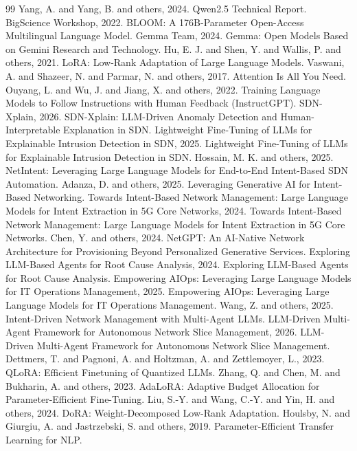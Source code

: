 \documentclass[12pt,a4paper]{article}
\begin{document}
\begin{thebibliography}{99}
 Yang, A. and Yang, B. and others, 2024. Qwen2.5 Technical Report.
 BigScience Workshop, 2022. BLOOM: A 176B-Parameter Open-Access Multilingual Language Model.
 Gemma Team, 2024. Gemma: Open Models Based on Gemini Research and Technology.
 Hu, E. J. and Shen, Y. and Wallis, P. and others, 2021. LoRA: Low-Rank Adaptation of Large Language Models.
 Vaswani, A. and Shazeer, N. and Parmar, N. and others, 2017. Attention Is All You Need.
 Ouyang, L. and Wu, J. and Jiang, X. and others, 2022. Training Language Models to Follow Instructions with Human Feedback (InstructGPT).
 SDN-Xplain, 2026. SDN-Xplain: LLM-Driven Anomaly Detection and Human-Interpretable Explanation in SDN.
 Lightweight Fine-Tuning of LLMs for Explainable Intrusion Detection in SDN, 2025. Lightweight Fine-Tuning of LLMs for Explainable Intrusion Detection in SDN.
 Hossain, M. K. and others, 2025. NetIntent: Leveraging Large Language Models for End-to-End Intent-Based SDN Automation.
 Adanza, D. and others, 2025. Leveraging Generative AI for Intent-Based Networking.
 Towards Intent-Based Network Management: Large Language Models for Intent Extraction in 5G Core Networks, 2024. Towards Intent-Based Network Management: Large Language Models for Intent Extraction in 5G Core Networks.
 Chen, Y. and others, 2024. NetGPT: An AI-Native Network Architecture for Provisioning Beyond Personalized Generative Services.
 Exploring LLM-Based Agents for Root Cause Analysis, 2024. Exploring LLM-Based Agents for Root Cause Analysis.
 Empowering AIOps: Leveraging Large Language Models for IT Operations Management, 2025. Empowering AIOps: Leveraging Large Language Models for IT Operations Management.
 Wang, Z. and others, 2025. Intent-Driven Network Management with Multi-Agent LLMs.
 LLM-Driven Multi-Agent Framework for Autonomous Network Slice Management, 2026. LLM-Driven Multi-Agent Framework for Autonomous Network Slice Management.
 Dettmers, T. and Pagnoni, A. and Holtzman, A. and Zettlemoyer, L., 2023. QLoRA: Efficient Finetuning of Quantized LLMs.
 Zhang, Q. and Chen, M. and Bukharin, A. and others, 2023. AdaLoRA: Adaptive Budget Allocation for Parameter-Efficient Fine-Tuning.
 Liu, S.-Y. and Wang, C.-Y. and Yin, H. and others, 2024. DoRA: Weight-Decomposed Low-Rank Adaptation.
 Houlsby, N. and Giurgiu, A. and Jastrzebski, S. and others, 2019. Parameter-Efficient Transfer Learning for NLP.

\end{thebibliography}
\end{document}
